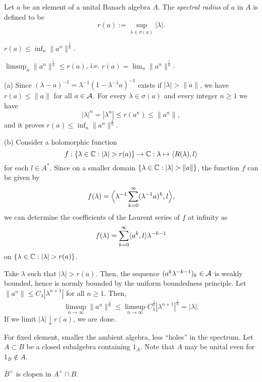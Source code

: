 \documentclass{../../large}
\begin{document}
\begin{prb}
Let $a$ be an element of a unital Banach algebra $A$.
The \emph{spectral radius} of $a$ in $A$ is defined to be
\[r(a):=\sup_{\lambda\in\sigma(a)}|\lambda|.\]
\begin{parts}
\item $r(a)\le\inf_n\|a^n\|^{\frac1n}$.
\item $\limsup_n\|a^n\|^{\frac1n}\le r(a)$, i.e. $r(a)=\lim_n\|a^n\|^{\frac1n}$.
\end{parts}
\end{prb}
\begin{pf}
(a)
Since $(\lambda-a)^{-1}=\lambda^{-1}(1-\lambda^{-1}a)^{-1}$ exists if $|\lambda|>\|a\|$, we have $r(a)\le\|a\|$ for all $a\in\mathcal{A}$.
For every $\lambda\in\sigma(a)$ and every integer $n\ge1$ we have
\[|\lambda|^n=|\lambda^n|\le r(a^n)\le\|a^n\|,\]
and it proves $r(a)\le\inf_n\|a^n\|^{\frac1n}$.

(b)
Consider a holomorphic function
\[f:\{\lambda\in\C:|\lambda|>r(a)\}\to\C:\lambda\mapsto\<R(\lambda),l\>\]
for each $l\in A^*$.
Since on a smaller domain $\{\lambda\in\C:|\lambda|>\|a\|\}$, the function $f$ can be given by
\[f(\lambda)=\Bigl\langle\lambda^{-1}\sum_{k=0}^\infty(\lambda^{-1}a)^k,l\Bigr\rangle,\]
we can determine the coefficients of the Laurent series of $f$ at infinity as
\[f(\lambda)=\sum_{k=0}^\infty\langle a^k,l\rangle\lambda^{-k-1}\]
on $\{\lambda\in\C:|\lambda|>r(a)\}$.

Take $\lambda$ such that $|\lambda|>r(a)$.
Then, the sequence $(a^k\lambda^{-k-1})_k\in\mathcal{A}$ is weakly bounded, hence is normly bounded by the uniform boundedness principle.
Let $\|a^n\|\le C_\lambda|\lambda^{n+1}|$ for all $n\ge1$.
Then,
\[\limsup_{n\to\infty}\|a^n\|^{\frac1n}\le\limsup_{n\to\infty}C_\lambda^{\frac1n}|\lambda^{n+1}|^{\frac1n}=|\lambda|.\]
If we limit $|\lambda|\downarrow r(a)$, we are done.
\end{pf}

\begin{prb}
For fixed element, smaller the ambient algebra, less ``holes'' in the spectrum.
Let $A\subset B$ be a closed subalgebra containing $1_A$.
Note that $A$ may be unital even for $1_B\notin A$.
\begin{parts}
\item $B^\times$ is clopen in $A^\times\cap B$.
\end{parts}
\end{prb}
\end{document}
